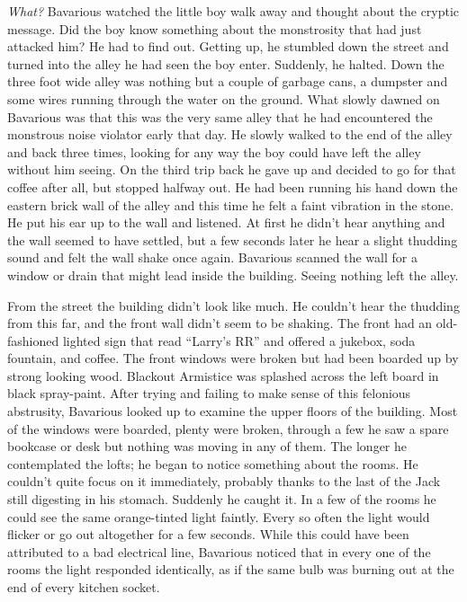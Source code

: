 {\em What?} Bavarious watched the little boy walk away and thought
about the cryptic message. Did the boy know something about the
monstrosity that had just attacked him? He had to find out. Getting
up, he stumbled down the street and turned into the alley he had
seen the boy enter. Suddenly, he halted. Down the three foot wide
alley was nothing but a couple of garbage cans, a dumpster and some
wires running through the water on the ground. What slowly dawned
on Bavarious was that this was the very same alley that he had
encountered the monstrous noise violator early that day. He slowly
walked to the end of the alley and back three times, looking for
any way the boy could have left the alley without him seeing. On
the third trip back he gave up and decided to go for that coffee
after all, but stopped halfway out. He had been running his hand
down the eastern brick wall of the alley and this time he felt a
faint vibration in the stone. He put his ear up to the wall and
listened. At first he didn't hear anything and the wall
seemed to have settled, but a few seconds later he hear a slight
thudding sound and felt the wall shake once again. Bavarious
scanned the wall for a window or drain that might lead inside the
building. Seeing nothing left the alley.



From the street the building didn't look like much. He couldn't hear the
thudding from this far, and the front wall didn't seem to be
shaking. The front had an old-fashioned lighted sign that read ``Larry's
RR'' and offered a jukebox, soda fountain, and coffee. The front windows
were broken but had been boarded up by strong looking wood. {\sc
  Blackout Armistice} was splashed across the left board in black
spray-paint. After trying and failing to make sense of this felonious
abstrusity, Bavarious looked up to examine the upper floors of the
building.  Most of the windows were boarded, plenty were broken, through
a few he saw a spare bookcase or desk but nothing was moving in any of
them. The longer he contemplated the lofts; he began to notice something
about the rooms. He couldn't quite focus on it immediately, probably
thanks to the last of the Jack still digesting in his stomach. Suddenly
he caught it. In a few of the rooms he could see the same orange-tinted
light faintly. Every so often the light would flicker or go out
altogether for a few seconds. While this could have been attributed to a
bad electrical line, Bavarious noticed that in every one of the rooms
the light responded identically, as if the same bulb was burning out at
the end of every kitchen socket.



